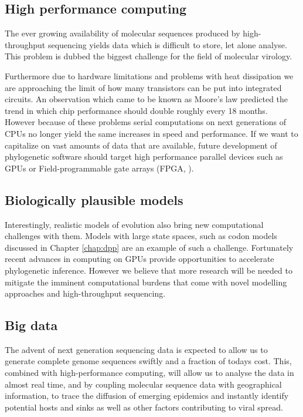 \subsection{High performance computing}

The ever growing availability of molecular sequences produced by high-throughput sequencing yields data which is difficult to store, let alone analyse.
This problem is dubbed the biggest challenge for the field of molecular virology. %

Furthermore due to hardware limitations and problems with heat dissipation we are approaching the limit of how many transistors can be put into integrated circuits.
An observation which came to be known as Moore's law predicted the trend in which chip performance should double roughly every 18 months.
However because of these problems serial computations on next generations of CPUs no longer yield the same increases in speed and performance.
If we want to capitalize on vast amounts of data that are available, future development of phylogenetic software should target high performance parallel devices such as GPUs \citep{Nickolls2008} or Field-programmable gate arrays (FPGA, \citet{Kuon2008}).

\subsection{Biologically plausible models}

Interestingly, realistic models of evolution also bring new computational challenges with them.
Models with large state spaces, such as codon models discussed in Chapter \ref{chap:dpp} are an example of such a challenge.
Fortunately recent advances in computing on GPUs \citep{Ayres2012} provide opportunities to accelerate phylogenetic inference.
However we believe that more research will be needed to mitigate the imminent computational burdens that come with novel modelling approaches and high-throughput sequencing. 

\subsection{Big data}

The advent of next generation sequencing data is expected to allow us to generate complete genome sequences swiftly and a fraction of todays cost.
This, combined with high-performance computing, will allow us to analyse the data in almost real time, and by coupling molecular sequence data with geographical information, to trace the diffusion of emerging epidemics and instantly identify potential hosts and sinks as well as other factors contributing to viral spread.   






















